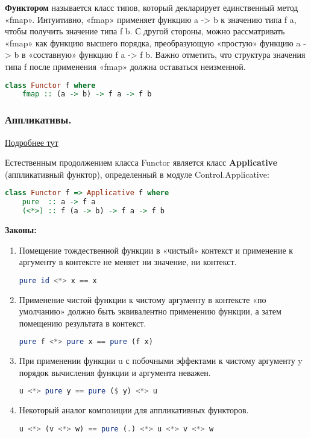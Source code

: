 \textbf{Функтором} называется класс типов, который декларирует единственный метод «fmap». Интуитивно, «fmap» применяет функцию a -> b к значению типа f a, чтобы получить значение типа f b. С другой стороны, можно рассматривать «fmap» как функцию высшего порядка, преобразующую «простую» функцию a -> b в «составную» функцию f a -> f b. Важно отметить, что структура значения типа f после применения «fmap» должна оставаться неизменной.

\begin{lstlisting}[language=Haskell]
	class Functor f where
	fmap :: (a -> b) -> f a -> f b
\end{lstlisting}

\subsubsection{Аппликативы.}
\href{http://cmc-msu-ai.github.io/haskell-course/lecture/2013/09/08/applicative-and-monad.html}{Подробнее тут}

Естественным продолжением класса Functor является класс \textbf{Applicative} (аппликативный функтор), определенный в модуле Control.Applicative:

\begin{lstlisting}[language=Haskell]
	class Functor f => Applicative f where
	pure  :: a -> f a
	(<*>) :: f (a -> b) -> f a -> f b
\end{lstlisting}

\textbf{Законы:}
\begin{enumerate}
	\item Помещение тождественной функции в «чистый» контекст и применение к аргументу в контексте не меняет ни значение, ни контекст.
	\begin{lstlisting}[language=Haskell]
		pure id <*> x == x
	\end{lstlisting}
	\item Применение чистой функции к чистому аргументу в контексте «по умолчанию» должно быть эквивалентно применению функции, а затем помещению результата в контекст.
	\begin{lstlisting}[language=Haskell]
		pure f <*> pure x == pure (f x)
	\end{lstlisting}
	\item При применении функции u с побочными эффектами к чистому аргументу y порядок вычисления функции и аргумента неважен.
	\begin{lstlisting}[language=Haskell]
		u <*> pure y == pure ($ y) <*> u
	\end{lstlisting}
	\item Некоторый аналог композиции для аппликативных функторов.
	\begin{lstlisting}[language=Haskell]
		u <*> (v <*> w) == pure (.) <*> u <*> v <*> w
	\end{lstlisting}
\end{enumerate} 

